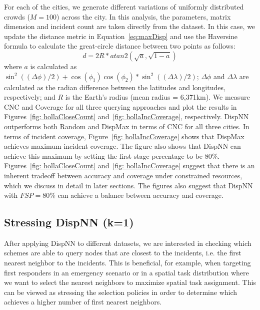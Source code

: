 \documentclass{acm_proc_article-sp}
\begin{document}
For each of the cities, we generate different variations of uniformly distributed crowds ($M = 100$) across the city. In this analysis, the parameters, matrix dimension and incident count are taken directly from the dataset. In this case, we update the distance metric in Equation~\ref{eq:maxDisp} and use the Haversine formula to calculate the great-circle distance between two points as follows:
\begin{equation} \label{eq:maxDisp2}
d = 2R*atan2(\sqrt{a}, \sqrt{1-a})
\end{equation}
where $a$ is calculated as $ \sin ^2((\Delta \phi)/2 ) + \cos(\phi_1)\cos(\phi_2) * \sin ^2((\Delta \lambda)/2 )$; $\Delta \phi$ and $\Delta \lambda$ are calculated as the radian difference between the latitudes and longitudes, respectively; and $R$ is the Earth's radius (mean radius = 6,371km). We measure CNC and Coverage for all three querying approaches and plot the results in Figures~\ref{fig: hollaCloseCount} and~\ref{fig: hollaIncCoverage}, respectively. DispNN outperforms both Random and DispMax in terms of CNC for all three cities. In terms of incident coverage, Figure~\ref{fig: hollaIncCoverage} shows that DispMax achieves maximum incident coverage. The figure also shows that DispNN can achieve this maximum by setting the first stage percentage to be $80\%$. Figures~\ref{fig: hollaCloseCount} and~\ref{fig: hollaIncCoverage} suggest that there is an inherent tradeoff between accuracy and coverage under constrained resources, which we discuss in detail in later sections. The figures also suggest that DispNN with $FSP = 80\%$ can achieve a balance between accuracy and coverage.\par

\subsection{Stressing DispNN (k=1)}
After applying DispNN to different datasets, we are interested in checking which schemes are able to query nodes that are closest to the incidents, i.e. the first nearest neighbor to the incidents. This is beneficial, for example, when targeting first responders in an emergency scenario or in a spatial task distribution where we want to select the nearest neighbors to maximize spatial task assignment. This can be viewed as stressing the selection policies in order to determine which achieves a higher number of first nearest neighbors.\par
\end{document}
